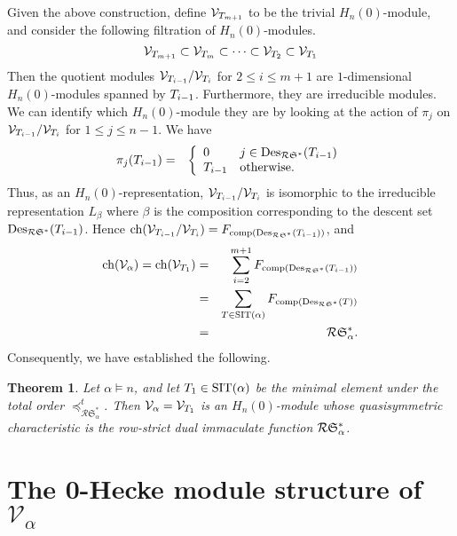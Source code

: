 \documentclass[12pt,letterpaper]{amsart}
\newtheorem{theorem}{Theorem}[section]
\theoremstyle{definition}
\newcommand{\poRI}{\preccurlyeq_{\mathcal{R}{\mathfrak{S}}^\ast _\alpha}}  \newcommand{\poA}{\preccurlyeq_{\mathcal{A}^\ast _\alpha}}  \newcommand{\poAbar}{\preccurlyeq_{\mathcal{\bar{A}}^\ast _\alpha} } \newcommand{\poRIcover}{\prec_{\mathcal{R}{\mathfrak{S}}^\ast _\alpha}}
\DeclareMathOperator{\comp}{comp}
\newcommand{\hn}{H_n(0)}
\begin{document}
Given the above construction, define $\mathcal{V}_{{T}_{m+1}}$ to be the trivial $\hn$-module, and consider the following filtration of $\hn$-modules.
$$
\mathcal{V}_{{T}_{m+1}}\subset \mathcal{V}_{{T}_m} \subset \cdots \subset \mathcal{V}_{{T}_{2}}\subset \mathcal{V}_{{T}_1} 
$$
Then the quotient modules $\mathcal{V}_{{T}_{i-1}}/\mathcal{V}_{{T}_{i}}$ for $2\leq i\leq m+1$ are $1$-dimensional $\hn$-modules spanned by ${T}_{i-1}$. Furthermore, they are irreducible modules. We can identify which $\hn$-module they are by looking at the action of $\pi_{j}$ on $\mathcal{V}_{{T}_{i-1}}/\mathcal{V}_{{T}_{i}}$ for $1\leq j\leq n-1$. We have
\begin{eqnarray*}
\pi_{j}({T}_{i-1})&=& \left \lbrace \begin{array}{ll}0 & j\in \mathrm{Des}_{\mathcal{R}\mathfrak{S}^\ast}({T}_{i-1})\\{T}_{i-1} & \text{otherwise.}\end{array}\right.
\end{eqnarray*}
Thus, as an $\hn$-representation, $\mathcal{V}_{{T}_{i-1}}/\mathcal{V}_{{T}_{i}}$ is isomorphic to the irreducible representation $L_{\beta}$ where $\beta$ is the composition corresponding to the descent set $\mathrm{Des}_{\mathcal{R}\mathfrak{S}^\ast}({T}_{i-1})$. Hence 
$\mathrm{ch}(\mathcal{V}_{\rtau_{i-1}}/\mathcal{V}_{\rtau_{i}})=F_{\comp(\desri(\rtau_{i-1}))}$, and 
\begin{eqnarray*}
\mathrm{ch}(\mathcal{V}_\alpha)=\mathrm{ch}(\mathcal{V}_{\rtau_1})
&=& \displaystyle \sum_{i=2}^{m+1}F_{\comp(\desri(\rtau_{i-1}))}\nonumber\\ 
&=& \displaystyle \sum_{\rtau \in \SIT(\alpha)}F_{\comp(\desri(\rtau))}\nonumber\\ 
&=& \RI_{\alpha}.
\end{eqnarray*}
Consequently, we have established the following.  

\begin{theorem}\label{the:bigone}
Let $\alpha \vDash n$, and let  ${T} _1 \in \operatorname{SIT} (\alpha)$ be the minimal element under the total order $\poRI ^t$. Then $\mathcal{V}_\alpha=\mathcal{V}_{{T}_1}$ is an $\hn$-module whose quasisymmetric characteristic is the row-strict dual immaculate function $\mathcal{R}{\mathfrak{S}}^\ast_{\alpha}$.\end{theorem}

\section{The 0-Hecke module structure of $\mathcal{V}_\alpha$}\label{sec:indecomp-module-and-poset}
\end{document}
